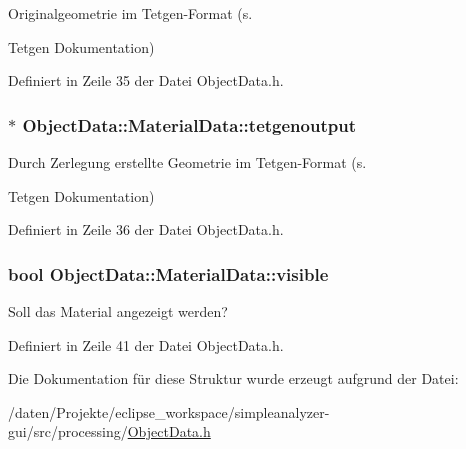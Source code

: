 Originalgeometrie im Tetgen-\/\-Format (s. 

Tetgen Dokumentation) 

Definiert in Zeile 35 der Datei Object\-Data.\-h.

\hypertarget{structObjectData_1_1MaterialData_a15d576cfe25abe334e34eb5e4671d6d7}{
\subsubsection[{tetgenoutput}]{$\ast$ Object\-Data\-::\-Material\-Data\-::tetgenoutput}}\label{structObjectData_1_1MaterialData_a15d576cfe25abe334e34eb5e4671d6d7}


Durch Zerlegung erstellte Geometrie im Tetgen-\/\-Format (s. 

Tetgen Dokumentation) 

Definiert in Zeile 36 der Datei Object\-Data.\-h.

\hypertarget{structObjectData_1_1MaterialData_a37980da11f6b51b30eb41c3ab4e9674a}{
\subsubsection[{visible}]{\setlength{\rightskip}{0pt plus 5cm}bool Object\-Data\-::\-Material\-Data\-::visible}}\label{structObjectData_1_1MaterialData_a37980da11f6b51b30eb41c3ab4e9674a}


Soll das Material angezeigt werden? 



Definiert in Zeile 41 der Datei Object\-Data.\-h.



Die Dokumentation für diese Struktur wurde erzeugt aufgrund der Datei\-:\begin{DoxyCompactItemize}
\item 
/daten/\-Projekte/eclipse\-\_\-workspace/simpleanalyzer-\/gui/src/processing/\hyperlink{ObjectData_8h}{Object\-Data.\-h}\end{DoxyCompactItemize}
